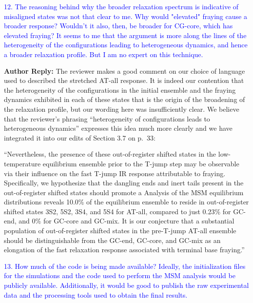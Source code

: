 \documentclass[11pt,a4paper]{letter} %
\newcommand*{\rood}[1]{{\color{red}{#1}}}
\begin{document}
\textcolor{blue}{12. The reasoning behind why the broader relaxation spectrum is indicative of misaligned states was not that clear to me. Why would "elevated" fraying cause a broader response? Wouldn't it also, then, be broader for CG-core, which has elevated fraying? It seems to me that the argument is more along the lines of the heterogeneity of the configurations leading to heterogeneous dynamics, and hence a broader relaxation profile. But I am no expert on this technique.}

\textbf{Author Reply:}   The reviewer makes a good comment on our choice of language used to described the stretched AT-all response. It is indeed our contention that the heterogeneity of the configurations in the initial ensemble and the fraying dynamics exhibited in each of these states that is the origin of the broadening of the relaxation profile, but our wording here was insufficiently clear. We believe that the reviewer's phrasing ``heterogeneity of configurations leads to heterogeneous dynamics'' expresses this idea much more clearly and we have integrated it into our edits of Section 3.7 on p.~33:

``Nevertheless, the presence of these out-of-register shifted states in the low-temperature equilibrium ensemble prior to the T-jump step may be observable via their influence on the fast T-jump IR response attributable to fraying. Specifically, we hypothesize that the dangling ends and inert tails present in the out-of-register shifted states should promote a \rood{broader fraying response over the course of the relaxation that is distinct from that of in-register fraying. This heterogeneity of configurations should lead to heterogeneous dynamics, manifested in the observation of a more stretched relaxation over experimental time scales of 70-100 ns.} Analysis of the MSM equilibrium distributions reveals 10.0\% of the equilibrium ensemble to reside in out-of-register shifted states 3S2, 5S2, 3S4, and 5S4 for AT-all, compared to just 0.23\% for GC-end, and 0\% for GC-core and GC-mix. It is our conjecture that a substantial population of out-of-register shifted states in the pre-T-jump AT-all ensemble should be distinguishable from the GC-end, GC-core, and GC-mix as an elongation of the fast relaxation response associated with terminal base fraying.''


\textcolor{blue}{13. How much of the code is being made available? Ideally, the initialization files for the simulations and the code used to perform the MSM analysis would be publicly available. Additionally, it would be good to publish the raw experimental data and the processing tools used to obtain the final results.}
\end{document}

